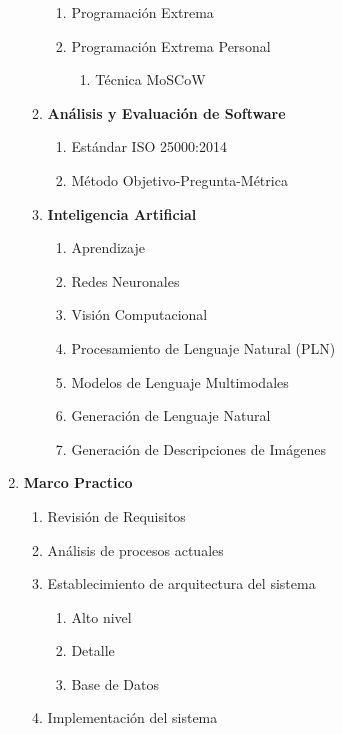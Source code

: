 \begin{enumerate}[label*=\arabic*.]
\begin{enumerate}[label*=\arabic*.]
\begin{enumerate}[label*=\arabic*.]
            \item Programación Extrema
            \item Programación Extrema Personal
            \begin{enumerate}[label*=\arabic*.]
                \item Técnica MoSCoW
            \end{enumerate}
        \end{enumerate}
        \item \textbf{Análisis y Evaluación de Software}
        \begin{enumerate}[label*=\arabic*.]
            \item Estándar ISO 25000:2014
            \item Método Objetivo-Pregunta-Métrica
        \end{enumerate}
        \item \textbf{Inteligencia Artificial}
        \begin{enumerate}[label*=\arabic*.]
            \item Aprendizaje
            \item Redes Neuronales
            \item Visión Computacional
            \item Procesamiento de Lenguaje Natural (PLN)
            \item Modelos de Lenguaje Multimodales
            \item Generación de Lenguaje Natural
            \item Generación de Descripciones de Imágenes
        \end{enumerate}
    \end{enumerate}
    \item \textbf{Marco Practico}
        \begin{enumerate}[label*=\arabic*.]
            \item Revisión de Requisitos
            \item Análisis de procesos actuales
            \item Establecimiento de arquitectura del sistema
            \begin{enumerate}[label*=\arabic*.]
                \item Alto nivel
                \item Detalle
                \item Base de Datos
            \end{enumerate}   
            \item Implementación del sistema

\end{enumerate}
\end{enumerate}
